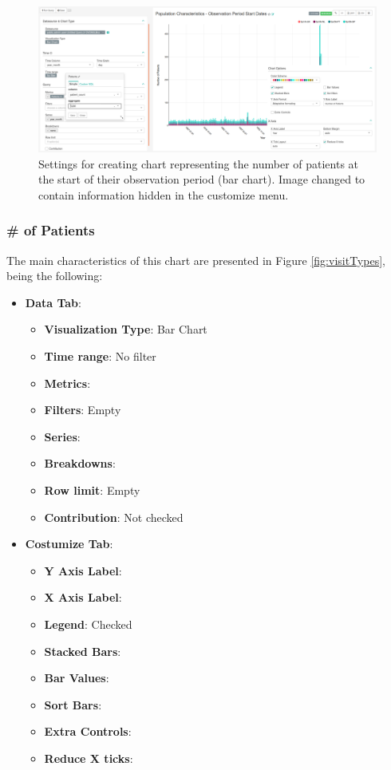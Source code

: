 \documentclass[]{book}
\providecommand{\tightlist}{%
  \setlength{\itemsep}{0pt}\setlength{\parskip}{0pt}}
\begin{document}
\begin{figure}
\includegraphics[width=1\linewidth]{images/populationCharacteristicsObservationPeriodStartDates} \caption{Settings for creating chart representing the number of patients at the start of their observation period (bar chart). Image changed to contain information hidden in the customize menu.}\label{fig:visitTypes4}
\end{figure}

\subsubsection{\# of Patients}\label{of-patients}

The main characteristics of this chart are presented in Figure
\ref{fig:visitTypes}, being the following:

\begin{itemize}
\tightlist
\item
  \textbf{Data Tab}:

  \begin{itemize}
  \tightlist
  \item
    \textbf{Visualization Type}: Bar Chart
  \item
    \textbf{Time range}: No filter
  \item
    \textbf{Metrics}:
  \item
    \textbf{Filters}: Empty
  \item
    \textbf{Series}:
  \item
    \textbf{Breakdowns}:
  \item
    \textbf{Row limit}: Empty
  \item
    \textbf{Contribution}: Not checked
  \end{itemize}
\item
  \textbf{Costumize Tab}:

  \begin{itemize}
  \tightlist
  \item
    \textbf{Y Axis Label}:
  \item
    \textbf{X Axis Label}:
  \item
    \textbf{Legend}: Checked
  \item
    \textbf{Stacked Bars}:
  \item
    \textbf{Bar Values}:
  \item
    \textbf{Sort Bars}:
  \item
    \textbf{Extra Controls}:
  \item
    \textbf{Reduce X ticks}:
  \end{itemize}
\end{itemize}
\end{document}
